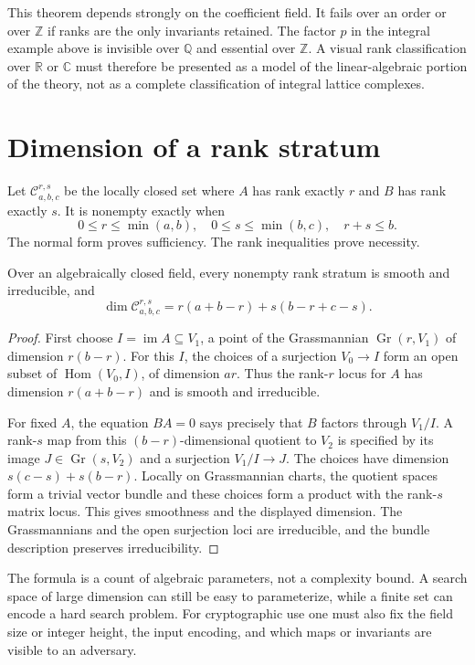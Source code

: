 This theorem depends strongly on the coefficient field. It fails over an order or over $\mathbb Z$ if ranks are the only invariants retained. The factor $p$ in the integral example above is invisible over $\mathbb Q$ and essential over $\mathbb Z$. A visual rank classification over $\mathbb R$ or $\mathbb C$ must therefore be presented as a model of the linear-algebraic portion of the theory, not as a complete classification of integral lattice complexes.

\section{Dimension of a rank stratum}

Let $\mathcal C^{r,s}_{a,b,c}$ be the locally closed set where $A$ has rank exactly $r$ and $B$ has rank exactly $s$. It is nonempty exactly when
\[
0\leq r\leq\min(a,b),\quad
0\leq s\leq\min(b,c),\quad r+s\leq b.
\]
The normal form proves sufficiency. The rank inequalities prove necessity.

\begin{theorem}
Over an algebraically closed field, every nonempty rank stratum is smooth and irreducible, and
\[
\dim\mathcal C^{r,s}_{a,b,c}
=r(a+b-r)+s(b-r+c-s).
\]
\end{theorem}
\begin{proof}
First choose $I=\operatorname{im}A\subseteq V_1$, a point of the Grassmannian $\operatorname{Gr}(r,V_1)$ of dimension $r(b-r)$. For this $I$, the choices of a surjection $V_0\to I$ form an open subset of $\operatorname{Hom}(V_0,I)$, of dimension $ar$. Thus the rank-$r$ locus for $A$ has dimension $r(a+b-r)$ and is smooth and irreducible.

For fixed $A$, the equation $BA=0$ says precisely that $B$ factors through $V_1/I$. A rank-$s$ map from this $(b-r)$-dimensional quotient to $V_2$ is specified by its image $J\in\operatorname{Gr}(s,V_2)$ and a surjection $V_1/I\to J$. The choices have dimension $s(c-s)+s(b-r)$. Locally on Grassmannian charts, the quotient spaces form a trivial vector bundle and these choices form a product with the rank-$s$ matrix locus. This gives smoothness and the displayed dimension. The Grassmannians and the open surjection loci are irreducible, and the bundle description preserves irreducibility.
\end{proof}

The formula is a count of algebraic parameters, not a complexity bound. A search space of large dimension can still be easy to parameterize, while a finite set can encode a hard search problem. For cryptographic use one must also fix the field size or integer height, the input encoding, and which maps or invariants are visible to an adversary.

